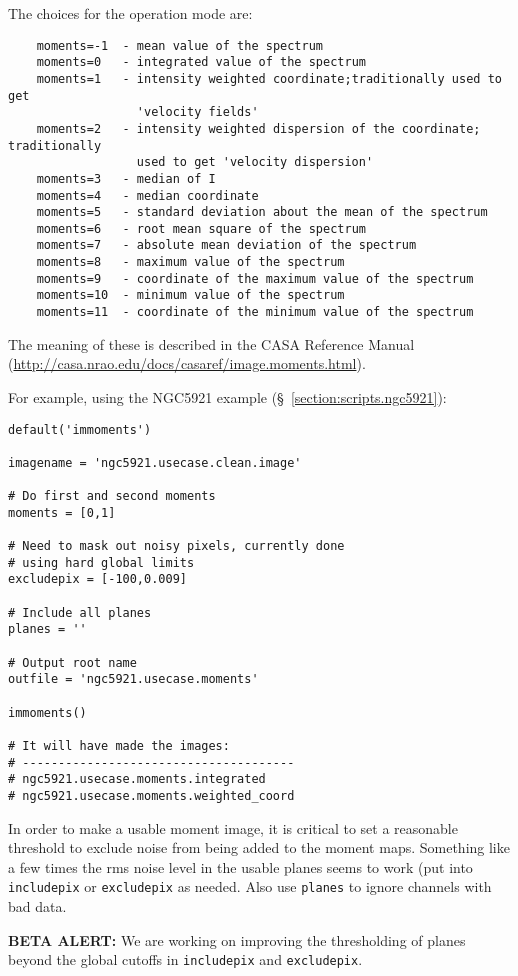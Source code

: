 The choices for the operation mode are:
\small
\begin{verbatim}
    moments=-1  - mean value of the spectrum
    moments=0   - integrated value of the spectrum
    moments=1   - intensity weighted coordinate;traditionally used to get 
                  'velocity fields'
    moments=2   - intensity weighted dispersion of the coordinate; traditionally
                  used to get 'velocity dispersion'
    moments=3   - median of I
    moments=4   - median coordinate
    moments=5   - standard deviation about the mean of the spectrum
    moments=6   - root mean square of the spectrum
    moments=7   - absolute mean deviation of the spectrum
    moments=8   - maximum value of the spectrum
    moments=9   - coordinate of the maximum value of the spectrum
    moments=10  - minimum value of the spectrum
    moments=11  - coordinate of the minimum value of the spectrum
\end{verbatim}
\normalsize
The meaning of these is described in the CASA Reference Manual
(\url{http://casa.nrao.edu/docs/casaref/image.moments.html}).

For example, using the NGC5921 example (\S~\ref{section:scripts.ngc5921}):
\small
\begin{verbatim}
default('immoments')

imagename = 'ngc5921.usecase.clean.image'

# Do first and second moments
moments = [0,1]

# Need to mask out noisy pixels, currently done
# using hard global limits
excludepix = [-100,0.009]

# Include all planes
planes = ''

# Output root name
outfile = 'ngc5921.usecase.moments'

immoments()

# It will have made the images:
# --------------------------------------
# ngc5921.usecase.moments.integrated
# ngc5921.usecase.moments.weighted_coord

\end{verbatim}
\normalsize

In order to make a usable moment image, it is critical to set a
reasonable threshold to exclude noise from being added to the
moment maps.  Something like a few times the rms noise level
in the usable planes seems to work (put into {\tt includepix}
or {\tt excludepix} as needed.  Also use {\tt planes} to ignore
channels with bad data.

{\bf BETA ALERT:} We are working on improving the thresholding
of planes beyond the global cutoffs in {\tt includepix}
and {\tt excludepix}.

